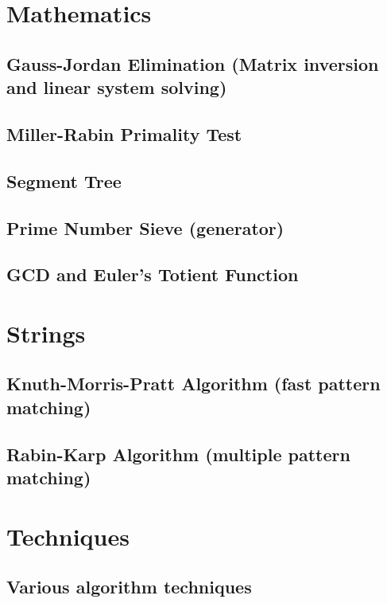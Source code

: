 \section{Mathematics}
\subsection{Gauss-Jordan Elimination (Matrix inversion and linear system solving)}
\raggedbottom
\hrulefill
\subsection{Miller-Rabin Primality Test}
\raggedbottom
\hrulefill
\subsection{Segment Tree}
\raggedbottom
\hrulefill
\subsection{Prime Number Sieve (generator)}
\raggedbottom
\hrulefill
\subsection{GCD and Euler's Totient Function}
\raggedbottom
\hrulefill

\section{Strings}
\subsection{Knuth-Morris-Pratt Algorithm (fast pattern matching)}
\raggedbottom
\hrulefill
\subsection{Rabin-Karp Algorithm (multiple pattern matching)}
\raggedbottom
\hrulefill

\section{Techniques}
\subsection{Various algorithm techniques}
\raggedbottom
\hrulefill

